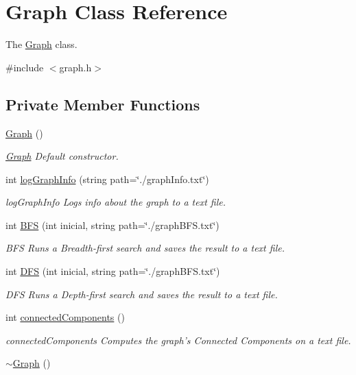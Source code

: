 \hypertarget{classGraph}{\section{Graph Class Reference}
\label{classGraph}
}


The \hyperlink{classGraph}{Graph} class.  




{\ttfamily \#include $<$graph.\-h$>$}

\subsection*{Private Member Functions}
\begin{DoxyCompactItemize}
\item 
\hyperlink{classGraph_ae4c72b8ac4d693c49800a4c7e273654f}{Graph} ()
\begin{DoxyCompactList}\small\item\em \hyperlink{classGraph}{Graph} Default constructor. \end{DoxyCompactList}\item 
int \hyperlink{classGraph_afc717aca3e9b9461e39ca5277224e673}{log\-Graph\-Info} (string path=\char`\"{}./graph\-Info.\-txt\char`\"{})
\begin{DoxyCompactList}\small\item\em log\-Graph\-Info Logs info about the graph to a text file. \end{DoxyCompactList}\item 
int \hyperlink{classGraph_ad6c509aa3988d91c15cafd67a0b1b096}{B\-F\-S} (int inicial, string path=\char`\"{}./graph\-B\-F\-S.\-txt\char`\"{})
\begin{DoxyCompactList}\small\item\em B\-F\-S Runs a Breadth-\/first search and saves the result to a text file. \end{DoxyCompactList}\item 
int \hyperlink{classGraph_ae85759cf5830f7899cfb872124fae808}{D\-F\-S} (int inicial, string path=\char`\"{}./graph\-B\-F\-S.\-txt\char`\"{})
\begin{DoxyCompactList}\small\item\em D\-F\-S Runs a Depth-\/first search and saves the result to a text file. \end{DoxyCompactList}\item 
int \hyperlink{classGraph_a684873414628f08f55ed4a08e9172255}{connected\-Components} ()
\begin{DoxyCompactList}\small\item\em connected\-Components Computes the graph's Connected Components on a text file. \end{DoxyCompactList}\item 
\hyperlink{classGraph_a902c5b3eacb66d60752525ab23297a95}{$\sim$\-Graph} ()
\end{DoxyCompactItemize}
